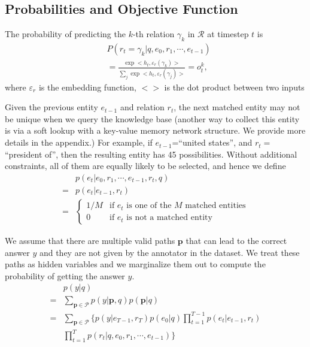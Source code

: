 \subsection{Probabilities and Objective Function} 
The probability of predicting the $k$-th relation $\gamma_k$ in $\mathcal{R}$ at timestep $t$ is 
\begin{align*}
&P(r_t=\gamma_k|q,e_0,r_1,\cdots,e_{t-1})\\
 &= \frac{\exp <h_t,\varepsilon_r(\gamma_k)>}{\sum_j\exp <h_t,\varepsilon_r(\gamma_j)>}=o^k_t,
\end{align*}
where $\varepsilon_r$ is the embedding function, $<>$ is the dot product between two inputs 


Given the previous entity $e_{t-1}$ and relation $r_t$, the next matched entity may not be unique when we query the knowledge base (another way to collect this entity is via a soft lookup with a key-value memory network structure. We provide more details in the appendix.)  For example, if $e_{t-1}$=``united states'', and $r_t=$ ``president of'', then the resulting entity has 45 possibilities. Without additional constraints, all of them are equally likely to be selected, and hence we define 
\begin{align*}
        &p(e_t|e_0,r_1,\cdots,e_{t-1},r_t,q)\\
        =&p(e_t|e_{t-1},r_t)\\
        =&\begin{cases}
        1/M & \text{if }e_t\text{ is one of the }M\text{  matched entities} \\
        0 & \text{if }e_t\text{ is not a matched entity}
\end{cases}    
\end{align*}

We assume that there are multiple valid paths $\mathbf{p}$ that can lead to the correct answer $y$ and they are not given by the annotator in the dataset. We treat these paths as hidden variables and we marginalize them out to compute the probability of getting the answer $y$.
\begin{align}
&p(y|q)\nonumber\\
=&\sum_{\mathbf{p}\in\mathcal{P}} p(y|\mathbf{p},q)p(\mathbf{p}|q)   \nonumber\\
=&\sum_{\mathbf{p}\in\mathcal{P}}\{p(y|e_{T-1},r_T)p(e_0|q)\prod_{t=1}^{T-1} p(e_t|e_{t-1},r_t)\nonumber\\ &\prod_{t=1}^T p(r_t|q,e_0,r_1,\cdots,e_{t-1})\}
\label{eq:marginal}
\end{align}

